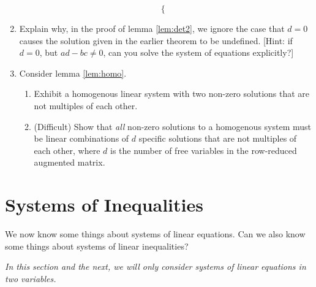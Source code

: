 \documentclass[a4paper,leqno]{article}
\numberwithin{equation}{section}
\theoremstyle{definition}
\theoremstyle{remark}
\begin{document}
\begin{enumerate}
\begin{equation*}
\begin{cases}
          \end{cases}
        \end{equation*}
  \item Explain why, in the proof of lemma \ref{lem:det2}, we ignore the case that $ d = 0 $ causes the solution given in the earlier
        theorem to be undefined. [Hint: if $ d = 0 $, but $ ad - bc \neq 0 $, can you solve the system of equations explicitly?]
  \item Consider lemma \ref{lem:homo}.
        \begin{enumerate}
          \item Exhibit a homogenous linear system with two non-zero solutions that are not multiples of each other.
          \item (Difficult) Show that \emph{all} non-zero solutions to a homogenous system must be linear combinations of $ d $ specific solutions that
                are not multiples of each other, where $ d $ is the number of free variables in the row-reduced augmented matrix.
        \end{enumerate}
\end{enumerate}

\section{Systems of Inequalities}
We now know some things about systems of linear equations. Can we also know some things about systems of linear inequalities?

\emph{In this section and the next, we will only consider systems of linear equations in two variables.}
\end{document}
